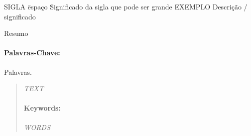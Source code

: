 \documentclass[brazil]{abnt-UVV/abnt-uvv}
\begin{document}
\pretextualchapter{\listofabreviationsname}

\begin{tabbing}
\hspace{0.80cm}SIGLA \= espaço \= Significado da sigla que pode ser grande \kill
\hspace{0.80cm}EXEMPLO 		\> \> Descrição / significado\\ 
\end{tabbing}

\sumario


\begin{resumo} 
Resumo

\paragraph{Palavras-Chave:} Palavras.
\end{resumo}

\begin{abstract}

\textit{ TEXT }

\paragraph{Keywords:} \textit{ WORDS }
\end{abstract}


\end{document}
